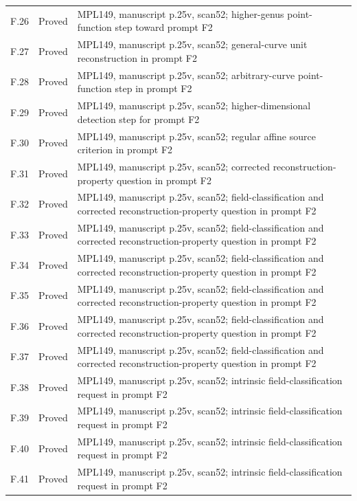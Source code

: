 {\begin{longtable}{p{1.9cm}p{1.7cm}p{10.3cm}}
F.26 & Proved & MPL149, manuscript p.25v, scan52; higher-genus point-function step toward prompt F2 \\
F.27 & Proved & MPL149, manuscript p.25v, scan52; general-curve unit reconstruction in prompt F2 \\
F.28 & Proved & MPL149, manuscript p.25v, scan52; arbitrary-curve point-function step in prompt F2 \\
F.29 & Proved & MPL149, manuscript p.25v, scan52; higher-dimensional detection step for prompt F2 \\
F.30 & Proved & MPL149, manuscript p.25v, scan52; regular affine source criterion in prompt F2 \\
F.31 & Proved & MPL149, manuscript p.25v, scan52; corrected reconstruction-property question in prompt F2 \\
F.32 & Proved & MPL149, manuscript p.25v, scan52; field-classification and corrected reconstruction-property question in prompt F2 \\
F.33 & Proved & MPL149, manuscript p.25v, scan52; field-classification and corrected reconstruction-property question in prompt F2 \\
F.34 & Proved & MPL149, manuscript p.25v, scan52; field-classification and corrected reconstruction-property question in prompt F2 \\
F.35 & Proved & MPL149, manuscript p.25v, scan52; field-classification and corrected reconstruction-property question in prompt F2 \\
F.36 & Proved & MPL149, manuscript p.25v, scan52; field-classification and corrected reconstruction-property question in prompt F2 \\
F.37 & Proved & MPL149, manuscript p.25v, scan52; field-classification and corrected reconstruction-property question in prompt F2 \\
F.38 & Proved & MPL149, manuscript p.25v, scan52; intrinsic field-classification request in prompt F2 \\
F.39 & Proved & MPL149, manuscript p.25v, scan52; intrinsic field-classification request in prompt F2 \\
F.40 & Proved & MPL149, manuscript p.25v, scan52; intrinsic field-classification request in prompt F2 \\
F.41 & Proved & MPL149, manuscript p.25v, scan52; intrinsic field-classification request in prompt F2 \\
\bottomrule\end{longtable}
}

